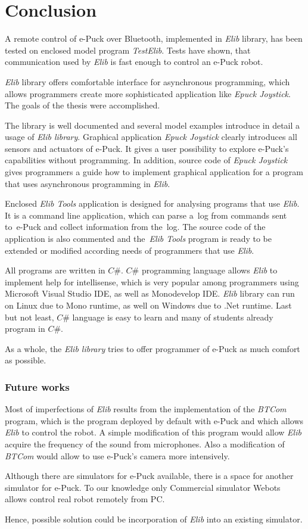 \chapter{Conclusion} \label{chap:conclusion}
  A remote control of e-Puck over Bluetooth, implemented in {\it Elib} library, 
  has been tested on enclosed model program {\it TestElib}. 
  Tests have shown, that communication used by {\it Elib} is fast enough
  to control an e-Puck robot.

  {\it Elib} library offers comfortable interface for asynchronous programming,
  which allows programmers create more sophisticated application like {\it Epuck Joystick}.
  The goals of the thesis were accomplished.
  
  The library is well documented and several model examples introduce in detail
  a usage of {\it Elib library}.
  Graphical application {\it Epuck Joystick} clearly introduces all sensors and actuators of e-Puck. 
  It gives a user possibility to explore e-Puck's capabilities without programming.
  In addition, source code of {\it Epuck Joystick} gives programmers a guide 
  how to implement graphical application for a program 
  that uses asynchronous programming in {\it Elib}. 

  Enclosed {\it Elib Tools} application is designed for analysing
  programs that use {\it Elib}.
  It is a command line application, which can parse a~log from commands sent 
  to~e-Puck and collect information from the~log.
  The source code of the application is also commented and 
  the~{\it Elib Tools} program is ready to be extended 
  or modified according needs of programmers that use {\it Elib}.
  
  All programs are written in $C\#$.  $C\#$ programming language
  allows {\it Elib} to implement help for intellisense,
  which is very popular among programmers using Microsoft Visual Studio IDE,
  as well as Monodevelop IDE. {\it Elib} library can run on Linux due to
  Mono runtime, as well on Windows due to .Net runtime.
  Last but not least, $C\#$ language is easy to learn 
  and many of students already program in $C\#$.

  As a whole, the {\it Elib library} tries to offer programmer
  of e-Puck as much comfort as possible.

\subsection*{Future works}
  Most of imperfections of {\it Elib} results from the implementation 
  of the {\it BTCom} program, which is the program deployed by default with e-Puck 
  and which allows {\it Elib} to control the robot.
  A simple modification of this program would allow {\it Elib} acquire the frequency 
  of the sound from microphones.
  Also a modification of {\it BTCom} would allow to use e-Puck's camera more intensively.

  Although there are simulators for e-Puck available, 
  there is a space for another simulator for e-Puck. To our knowledge only
  Commercial simulator Webots allows control real robot remotely from PC. 

  Hence, possible solution could be incorporation of {\it Elib} into an existing simulator.
